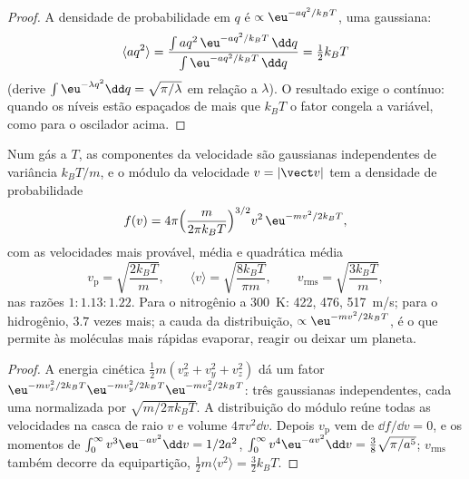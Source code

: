 \begin{proof}
A densidade de probabilidade em $q$ é $\propto\eu^{-aq^2/k_BT}$, uma gaussiana:
\[
\langle aq^2\rangle = \frac{\int aq^2\,\eu^{-aq^2/k_BT}\,\dd q}{\int\eu^{-aq^2/k_BT}\,\dd q} = \tfrac12k_BT
\]
(derive $\int\eu^{-\lambda q^2}\dd q = \sqrt{\pi/\lambda}$ em relação a
$\lambda$). O resultado exige o contínuo: quando os
níveis estão espaçados de mais que $k_BT$ o fator congela a variável,
como para o oscilador acima.
\end{proof}

\begin{theorem}\label{thm:b2:boltzmann-factor:maxwell}
Num gás a $T$, as componentes da velocidade são gaussianas independentes de
variância $k_BT/m$, e o módulo da velocidade $v = |\vect v|$ tem a densidade
de probabilidade
\[
f(v) = 4\pi\Big(\frac{m}{2\pi k_BT}\Big)^{3/2}v^2\,\eu^{-mv^2/2k_BT} ,
\]
com as velocidades mais provável, média e quadrática média
\[
v_{\text{p}} = \sqrt{\frac{2k_BT}{m}}, \qquad
\langle v\rangle = \sqrt{\frac{8k_BT}{\pi m}}, \qquad
v_{\text{rms}} = \sqrt{\frac{3k_BT}{m}} ,
\]
nas razões $1 : 1.13 : 1.22$. Para o nitrogênio a \qty{300}{K}: \qty{422}{},
\qty{476}{}, \qty{517}{m/s}; para o hidrogênio, $3.7$ vezes mais; a
cauda da distribuição, $\propto\eu^{-mv^2/2k_BT}$, é o que permite às
moléculas mais rápidas evaporar, reagir ou deixar um planeta.
\end{theorem}

\begin{proof}
A energia cinética $\tfrac12m(v_x^2 + v_y^2 + v_z^2)$ dá um fator
$\eu^{-mv_x^2/2k_BT}\eu^{-mv_y^2/2k_BT}\eu^{-mv_z^2/2k_BT}$: três gaussianas
independentes, cada uma normalizada por $\sqrt{m/2\pi k_BT}$. A distribuição
do módulo reúne todas as velocidades na casca de raio $v$ e
volume $4\pi v^2\dd v$. Depois $v_{\text{p}}$ vem de $\dd f/\dd v = 0$, e os
momentos de $\int_0^\infty v^3\eu^{-av^2}\dd v = 1/2a^2$, $\int_0^\infty
v^4\eu^{-av^2}\dd v = \tfrac38\sqrt{\pi/a^5}$; $v_{\text{rms}}$ também decorre
da equipartição, $\tfrac12m\langle v^2\rangle = \tfrac32k_BT$.
\end{proof}


